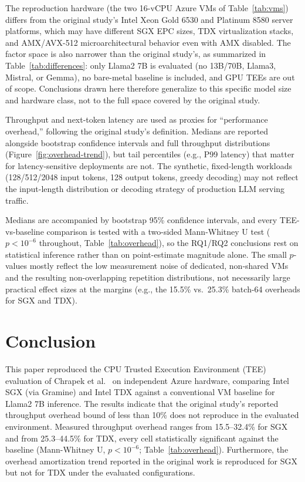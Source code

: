 \documentclass[sigconf]{acmart}
\begin{document}
The reproduction hardware (the two 16-vCPU Azure VMs of Table~\ref{tab:vms}) differs
from the original study's Intel Xeon Gold 6530 and Platinum 8580 server platforms,
which may have different SGX EPC sizes, TDX virtualization stacks, and AMX/AVX-512
microarchitectural behavior even with AMX disabled. The factor space is also narrower
than the original study's, as summarized in Table~\ref{tab:differences}: only Llama2
7B is evaluated (no 13B/70B, Llama3, Mistral, or Gemma), no bare-metal baseline is
included, and GPU TEEs are out of scope. Conclusions drawn here therefore generalize to
this specific model size and hardware class, not to the full space covered by the
original study.

Throughput and next-token latency are used as proxies for ``performance overhead,''
following the original study's definition. Medians are reported alongside bootstrap
confidence intervals and full throughput distributions (Figure~\ref{fig:overhead-trend}),
but tail percentiles (e.g., P99 latency) that matter for latency-sensitive deployments
are not. The synthetic, fixed-length workloads (128/512/2048 input tokens, 128 output
tokens, greedy decoding) may not reflect the input-length distribution or decoding
strategy of production LLM serving traffic.

Medians are accompanied by bootstrap 95\% confidence intervals, and every
TEE-vs-baseline comparison is tested with a two-sided Mann-Whitney U test
($p < 10^{-6}$ throughout, Table~\ref{tab:overhead}), so the RQ1/RQ2 conclusions rest
on statistical inference rather than on point-estimate magnitude alone. The small
$p$-values mostly reflect the low measurement noise of dedicated, non-shared VMs and
the resulting non-overlapping repetition distributions, not necessarily large practical
effect sizes at the margins (e.g., the 15.5\% vs.\ 25.3\% batch-64 overheads for SGX and
TDX).

\section{Conclusion}
\label{sec:conclusion}

This paper reproduced the CPU Trusted Execution Environment (TEE) evaluation of
Chrapek et al.~\cite{chrapek2025confidential} on independent Azure hardware, comparing
Intel SGX (via Gramine) and Intel TDX against a conventional VM baseline for Llama2 7B
inference. The results indicate that the original study's reported throughput overhead
bound of less than 10\% does not reproduce in the evaluated environment. Measured
throughput overhead ranges from 15.5--32.4\% for SGX and from 25.3--44.5\% for TDX,
every cell statistically significant against the baseline (Mann-Whitney U,
$p < 10^{-6}$; Table~\ref{tab:overhead}). Furthermore, the overhead amortization trend
reported in the original work is reproduced for SGX but not for TDX under the
evaluated configurations.
\end{document}
